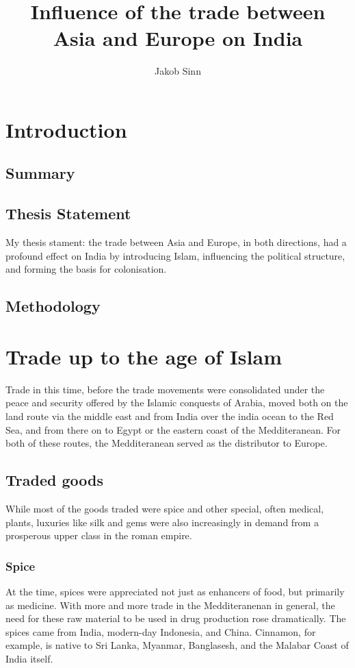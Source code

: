 \documentclass[11pt, a4paper]{scrreprt}
\begin{document}
\renewcommand{\baselinestretch}{1.5}
\subject{Facharbeit}
\author{Jakob Sinn}
\title{Influence of the trade between \\ Asia and Europe on India}
\maketitle
\tableofcontents
{}
\chapter{Introduction}
\section{Summary}

\section{Thesis Statement}
My thesis stament: the trade between Asia and Europe, in both directions, had a profound effect on India by introducing Islam, influencing the political structure, and forming the basis for colonisation.
\section{Methodology}
 
\chapter{Trade up to the age of Islam}
Trade in this time, before the trade movements were consolidated under the peace and security offered by the Islamic conquests of Arabia, moved both on the land route via the middle east and from India over the india ocean to the Red Sea, and from there on to Egypt or the eastern coast of the Medditeranean. For both of these routes, the Medditeranean served as the distributor to Europe.

\section{Traded goods}
While most of the goods traded were spice and other special, often medical, plants, luxuries like silk and gems were also increasingly in demand from a prosperous upper class in the roman empire.
\subsection{Spice}
At the time, spices were appreciated not just as enhancers of food, but primarily as medicine.\cite{MST} With more and more trade in the Medditeranenan in general, the need for these raw material to be used in drug production rose dramatically.
The spices came from India, modern-day Indonesia, and China. Cinnamon, for example, is native to Sri Lanka, Myanmar, Banglasesh, and the Malabar Coast of India itself\cite{Cinnamon}.
\end{document}
